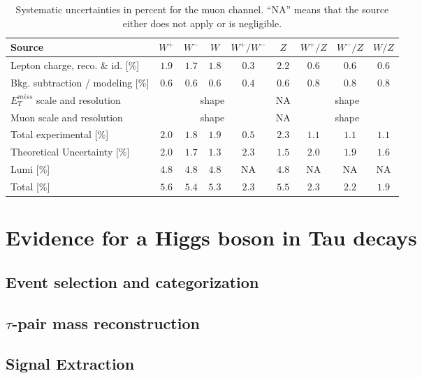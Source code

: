 \begin{table}[htbp]
\centering
\small
\begin {tabular}  {lcccccccc}
Source & $W^+$ & $W^-$ & $W$ & $W^+/W^-$ & $Z$ & $W^+/Z$ & $W^-/Z$ & $W/Z$ \\
\hline
Lepton charge, reco. \& id. [\%] & $1.9$ & $1.7$ & $1.8$ & $0.3$ & $2.2$ & $0.6$ & $0.6$ & $0.6$ \\
Bkg. subtraction / modeling [\%] & $0.6$ & $0.6$ & $0.6$ & $0.4$ & $0.6$ & $0.8$ & $0.8$ & $0.8$ \\ 
$E_{T}^{miss}$ scale and resolution  & \multicolumn{4}{c}{shape}  & NA & \multicolumn{3}{c}{shape}  \\ 
Muon scale and resolution & \multicolumn{4}{c}{shape}  & NA & \multicolumn{3}{c}{shape}  \\ 
\hline
Total experimental [\%] & $2.0$ & $1.8$ & $1.9$ & $0.5$ & $2.3$ & $1.1$ & $1.1$ & $1.1$ \\
\hline 
Theoretical Uncertainty [\%] & $2.0$ & $1.7$ & $1.3$ & $2.3$ & $1.5$ & $2.0$ & $1.9$ & $1.6$ \\
\hline
Lumi [\%] & $4.8$ & $4.8$ & $4.8$ & NA & $4.8$ & NA & NA & NA \\
\hline
Total [\%] & $5.6$ & $5.4$ & $5.3$ & $2.3$ & $5.5$ & $2.3$ & $2.2$ & $1.9$ \\
\end {tabular}
\caption[.]{ \label{tab:syst_mu}
Systematic uncertainties in percent for the muon channel. ``NA'' means that the source either does not apply or is negligible.}
\end{table} 

\section{Evidence for a Higgs boson in Tau decays}

\subsection{Event selection and categorization}

\subsection{$\tau$-pair mass reconstruction}

\subsection{Signal Extraction}

